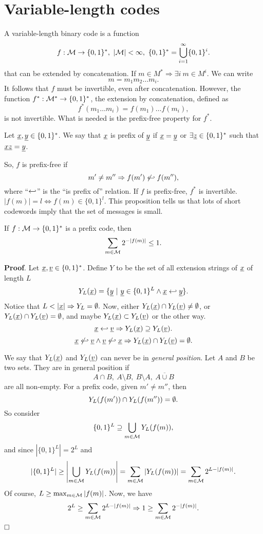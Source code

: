 \chapter{Variable-length codes}

A variable-length binary code is a function 
\[
f:\mathcal{M} \rightarrow \{0, 1\}^*,\ |\mathcal{M}| < \infty,\ \{0, 1\}^* = \bigcup_{i = 1}^\infty \{0, 1\}^i.
\]
that can be extended by concatenation. If $m \in M^* \Rightarrow \exists i\ m \in M^i$. We can write $$m = m_1m_2\ldots m_i.$$ It follows that $f$ must be invertible, even after concatenation. However, the function $f^*:\mathcal{M}^* \rightarrow \{0, 1\}^*$, the extension by concatenation, defined as $$f^*(m_1\ldots m_i) = f(m_1)\ldots f(m_i),$$ is not invertible. What is needed is the prefix-free property for $f^*$.

Let $\underline{x}, \underline{y} \in \{0, 1\}^*$. We say that $\underline{x}$ is prefix of $\underline{y}$ if $\underline{x} = \underline{y}$ or $\exists \underline{z} \in \{0, 1\}^*$ such that $\underline{x}\underline{z} = \underline{y}$.

 So, $f$ is prefix-free if $$m'\not=m'' \Rightarrow f(m') \not\hookleftarrow f(m''),$$ where ``$\hookleftarrow$'' is the ``is prefix of'' relation. If $f$ is prefix-free, $f^*$ is invertible. $|f(m)| = l \Leftrightarrow f(m) \in \{0, 1\}^l$. This proposition tells us that lots of short codewords imply that the set of messages is small.

\begin{prop}\label{prop:kraft}
	If $f:\mathcal{M} \rightarrow \{0, 1\}^*$ is a prefix code, then $$\sum_{m\in\mathcal{M}}2^{-|f(m)|}\leq 1.$$
\end{prop}

\noindent\textbf{Proof}. Let $\underline{x}, \underline{v} \in \{0, 1\}^*$. Define $Y$ to be the set of all extension strings of $\underline{x}$ of length $L$
$$Y_L(\underline{x}) = \{\underline{y}\ |\ \underline{y} \in \{0, 1\}^L \wedge \underline{x} \hookleftarrow \underline{y} \}.$$
Notice that $L < |\underline{x}| \Rightarrow Y_L = \emptyset.$ Now, either $Y_L(\underline{x}) \cap Y_L(\underline{v}) \not= \emptyset$, or $Y_L(\underline{x}) \cap Y_L(\underline{v}) = \emptyset$, and maybe $Y_L(\underline{x}) \subset Y_L(\underline{v})$ or the other way. 
$$\underline{x} \hookleftarrow \underline{v} \Rightarrow Y_L(\underline{x}) \supseteq Y_L(\underline{v}).$$
$$\underline{x} \not\hookleftarrow \underline{v} \wedge \underline{v} \not\hookleftarrow \underline{x} \Rightarrow Y_L(\underline{x}) \cap Y_L(\underline{v}) = \emptyset.$$

We say that $Y_L(\underline{x})$ and $Y_L(\underline{v})$ can never be in \emph{general position}. Let $A$ and  $B$ be two sets. They are in general position if $$A\cap B,\ A \setminus B,\ B \setminus A,\ \overline{A\cup B}$$ are all non-empty. For a prefix code, given $m'\not= m''$, then $$Y_L(f(m')) \cap Y_L(f(m'')) = \emptyset.$$ So consider $$\{0, 1\}^L \supseteq \bigcup_{m \in\mathcal{M}}Y_L(f(m)),$$ and since $|\{0, 1\}^L| = 2^L$ and $$|\{0, 1\}^L| \geq \left|\bigcup_{m\in\mathcal{M}}Y_L(f(m))\right| = \sum_{m\in\mathcal{M}} |Y_L(f(m))| = \sum_{m \in \mathcal{M}} 2^{L - |f(m)|}.$$ Of course, $L \geq \max_{m \in \mathcal{M}} |f(m)|$. Now, we have
$$2^L \geq \sum_{m\in\mathcal{M}}2^{L - |f(m)|} \Rightarrow 1 \geq \sum_{m\in\mathcal{M}} 2^{-|f(m)|}.$$
$\hfill\Box$

